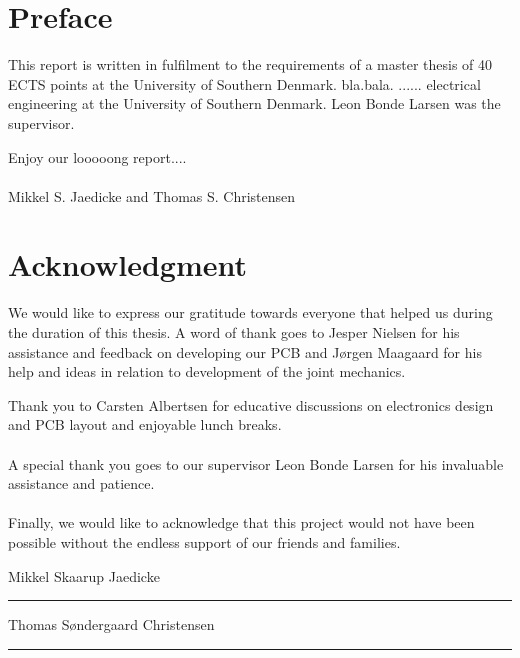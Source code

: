 
\section*{Preface}
This report is written in fulfilment to the requirements of a master thesis of 40 ECTS points at the University of Southern Denmark.
bla.bala. 
 ...... electrical engineering at the University of Southern Denmark.
Leon Bonde Larsen was the supervisor.


Enjoy our looooong report....
\\~\\
Mikkel S. Jaedicke and Thomas S. Christensen

\section*{Acknowledgment}

We would like to express our gratitude towards everyone that helped us during the duration of this thesis.
A word of thank goes to Jesper Nielsen for his assistance and feedback on developing our PCB and Jørgen Maagaard for his help and ideas in relation to development of the joint mechanics. 

Thank you to Carsten Albertsen for educative discussions on electronics design and PCB layout and enjoyable lunch breaks. 
\\~\\
A special thank you goes to our supervisor Leon Bonde Larsen for his invaluable assistance and patience.
\\~\\
Finally, we would like to acknowledge that this project would not have been possible without the endless support of our friends and families.


\vspace{1cm}
\begin{center}
	\begin{minipage}[t]{.49\textwidth}\large
		\begin{center}
		Mikkel Skaarup Jaedicke\\
		\vspace{1cm}
		\hrule
		\vspace{0.5cm}
		Thomas Søndergaard Christensen
		\vspace{1cm}
		\hrule
		\end{center} 
	\end{minipage}
\end{center}

